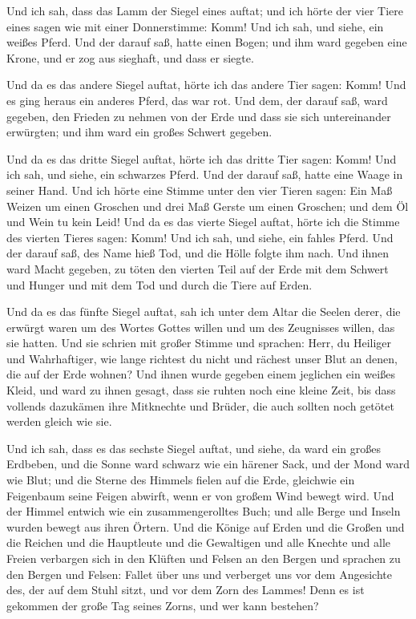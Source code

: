  Und ich sah, dass das Lamm der Siegel eines auftat; und
ich hörte der vier Tiere eines sagen wie mit einer Donnerstimme: Komm!
 Und ich sah, und siehe, ein weißes Pferd. Und der darauf
saß, hatte einen Bogen; und ihm ward gegeben eine Krone, und er zog aus
sieghaft, und dass er siegte.

 Und da es das andere Siegel auftat, hörte ich das andere
Tier sagen: Komm!  Und es ging heraus ein anderes Pferd,
das war rot. Und dem, der darauf saß, ward gegeben, den Frieden zu
nehmen von der Erde und dass sie sich untereinander erwürgten; und ihm
ward ein großes Schwert gegeben.

 Und da es das dritte Siegel auftat, hörte ich das dritte
Tier sagen: Komm! Und ich sah, und siehe, ein schwarzes Pferd. Und der
darauf saß, hatte eine Waage in seiner Hand.  Und ich
hörte eine Stimme unter den vier Tieren sagen: Ein Maß Weizen um einen
Groschen und drei Maß Gerste um einen Groschen; und dem Öl und Wein tu
kein Leid!  Und da es das vierte Siegel auftat, hörte ich
die Stimme des vierten Tieres sagen: Komm!  Und ich sah,
und siehe, ein fahles Pferd. Und der darauf saß, des Name hieß Tod, und
die Hölle folgte ihm nach. Und ihnen ward Macht gegeben, zu töten den
vierten Teil auf der Erde mit dem Schwert und Hunger und mit dem Tod und
durch die Tiere auf Erden.

 Und da es das fünfte Siegel auftat, sah ich unter dem
Altar die Seelen derer, die erwürgt waren um des Wortes Gottes willen
und um des Zeugnisses willen, das sie hatten.  Und sie
schrien mit großer Stimme und sprachen: Herr, du Heiliger und
Wahrhaftiger, wie lange richtest du nicht und rächest unser Blut an
denen, die auf der Erde wohnen?  Und ihnen wurde gegeben
einem jeglichen ein weißes Kleid, und ward zu ihnen gesagt, dass sie
ruhten noch eine kleine Zeit, bis dass vollends dazukämen ihre
Mitknechte und Brüder, die auch sollten noch getötet werden gleich wie
sie.

 Und ich sah, dass es das sechste Siegel auftat, und
siehe, da ward ein großes Erdbeben, und die Sonne ward schwarz wie ein
härener Sack, und der Mond ward wie Blut;  und die Sterne
des Himmels fielen auf die Erde, gleichwie ein Feigenbaum seine Feigen
abwirft, wenn er von großem Wind bewegt wird.  Und der
Himmel entwich wie ein zusammengerolltes Buch; und alle Berge und Inseln
wurden bewegt aus ihren Örtern.  Und die Könige auf Erden
und die Großen und die Reichen und die Hauptleute und die Gewaltigen und
alle Knechte und alle Freien verbargen sich in den Klüften und Felsen an
den Bergen  und sprachen zu den Bergen und Felsen: Fallet
über uns und verberget uns vor dem Angesichte des, der auf dem Stuhl
sitzt, und vor dem Zorn des Lammes!  Denn es ist gekommen
der große Tag seines Zorns, und wer kann bestehen?

